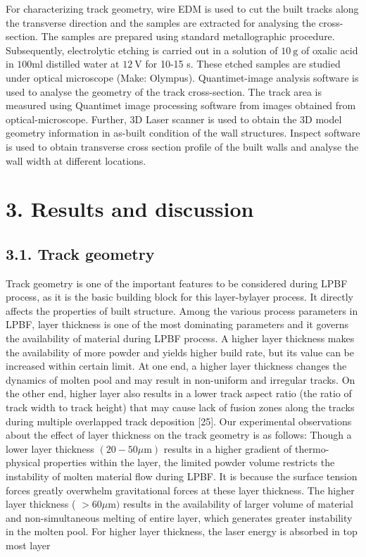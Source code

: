 \documentclass[10pt]{article}
\begin{document}
For characterizing track geometry, wire EDM is used to cut the built tracks along the transverse direction and the samples are extracted for analysing the cross-section. The samples are prepared using standard metallographic procedure. Subsequently, electrolytic etching is carried out in a solution of $10 \mathrm{~g}$ of oxalic acid in $100 \mathrm{ml}$ distilled water at $12 \mathrm{~V}$ for 10-15 s. These etched samples are studied under optical microscope (Make: Olympus). Quantimet-image analysis software is used to analyse the geometry of the track cross-section. The track area is measured using Quantimet image processing software from images obtained from optical-microscope. Further, 3D Laser scanner is used to obtain the 3D model geometry information in as-built condition of the wall structures. Inspect software is used to obtain transverse cross section profile of the built walls and analyse the wall width at different locations.

\section*{3. Results and discussion}
\subsection*{3.1. Track geometry}
Track geometry is one of the important features to be considered during LPBF process, as it is the basic building block for this layer-bylayer process. It directly affects the properties of built structure. Among the various process parameters in LPBF, layer thickness is one of the most dominating parameters and it governs the availability of material during LPBF process. A higher layer thickness makes the availability of more powder and yields higher build rate, but its value can be increased within certain limit. At one end, a higher layer thickness changes the dynamics of molten pool and may result in non-uniform and irregular tracks. On the other end, higher layer also results in a lower track aspect ratio (the ratio of track width to track height) that may cause lack of fusion zones along the tracks during multiple overlapped track deposition [25]. Our experimental observations about the effect of layer thickness on the track geometry is as follows: Though a lower layer thickness $(20-50 \mu \mathrm{m})$ results in a higher gradient of thermo-physical properties within the layer, the limited powder volume restricts the instability of molten material flow during LPBF. It is because the surface tension forces greatly overwhelm gravitational forces at these layer thickness. The higher layer thickness ( $>60 \mu \mathrm{m})$ results in the availability of larger volume of material and non-simultaneous melting of entire layer, which generates greater instability in the molten pool. For higher layer thickness, the laser energy is absorbed in top most layer
\end{document}
